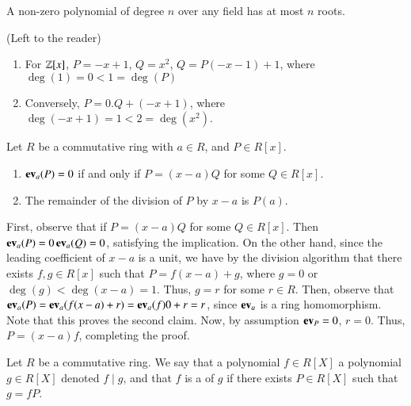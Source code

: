 \documentclass[12pt, a4paper, twoside, openright, titlepage]{book}
\begin{document}
\begin{cor}{}{}
    A non-zero polynomial of degree $n$ over any field has at most $n$ roots.
\end{cor}
\begin{proof*}
    (Left to the reader)
\end{proof*}


\begin{eg}{}{}
    \leavevmode
    \begin{enumerate}
        \item For $\mathbb Z[x]$, $P = -x+1$, $Q = x^2$, $Q = P(-x-1) + 1$, where $\deg(1) = 0 < 1 = \deg(P)$
        \item Conversely, $P = 0.Q + (-x+1)$, where $\deg(-x+1) = 1 < 2 = \deg(x^2)$.
    \end{enumerate}
\end{eg}

\begin{cor}{}{}
    Let $R$ be a commutative ring with $a \in R$, and $P \in R[x]$. \begin{enumerate}
        \item $\operatorname{\bf{ev}}_a(P) = 0$ if and only if $P = (x-a)Q$ for some $Q \in R[x]$.
        \item The remainder of the division of $P$ by $x-a$ is $P(a)$.
    \end{enumerate}
    \begin{proof*}{}{}
        First, observe that if $P = (x-a)Q$ for some $Q \in R[x]$. Then $\operatorname{\bf{ev}}_a(P) = 0\operatorname{\bf{ev}}_a(Q) = 0$, satisfying the implication. On the other hand, since the leading coefficient of $x-a$ is a unit, we have by the division algorithm that there exists $f,g \in R[x]$ such that $P = f(x-a) + g$, where $g = 0$ or $\deg(g) < \deg(x-a) = 1$. Thus, $g = r$ for some $r \in R$. Then, observe that $\operatorname{\bf{ev}}_a(P) = \operatorname{\bf{ev}}_a(f(x-a) + r) = \operatorname{\bf{ev}}_a(f)0+r = r$, since $\operatorname{\bf{ev}}_a$ is a ring homomorphism. Note that this proves the second claim. Now, by assumption $\operatorname{\bf{ev}}_P = 0$, $r = 0$. Thus, $P = (x-a)f$, completing the proof.
    \end{proof*}
\end{cor}


\begin{defn}{}{}
    Let $R$ be a commutative ring. We say that a polynomial $f \in R[X]$  a polynomial $g \in R[X]$ denoted $f\;\vert\;g$, and that $f$ is a  of $g$ if there exists $P \in R[X]$ such that $g = fP$.
\end{defn}
\end{document}
